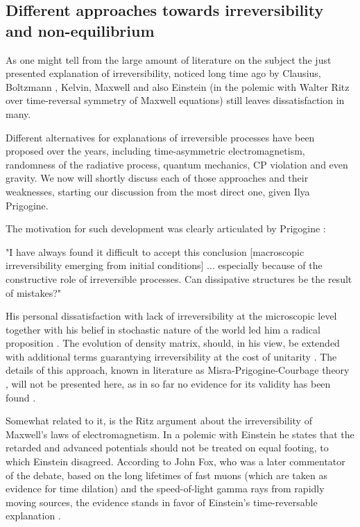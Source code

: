 \documentclass[a4paper,12pt]{article}
\begin{document}
\subsection{Different approaches towards irreversibility and non-equilibrium}

As one might tell from the large amount of literature on the subject \cite{Doyle:wf, Layzer:1970dx, Wolfram:552851, Rovelli:2015tv, Courbage:1983eo} %
the just presented explanation of irreversibility, noticed long time ago by Clausius, Boltzmann \cite{Wolfram:552851}, Kelvin, Maxwell \cite{Anonymous:0uVSJOI5} and also Einstein (in the polemic with Walter Ritz over time-reversal symmetry of Maxwell equations) still leaves dissatisfaction in many.

Different alternatives for explanations of irreversible processes have been proposed over the years, including time-asymmetric electromagnetism, randomness of the radiative process, quantum mechanics, CP violation and even gravity. We now will shortly discuss each of those approaches and their weaknesses, starting our discussion from the most direct one, given Ilya Prigogine.

The motivation for such development was clearly articulated by Prigogine \cite{Prigogine:1978kz}:
\begin{displayquote}
"I have always found it difficult to accept this conclusion [macroscopic irreversibility emerging from initial conditions] {...} especially because of the constructive role of irreversible processes. Can dissipative structures be the result of mistakes?"
\end{displayquote}

His personal dissatisfaction with lack of irreversibility at the microscopic level together with his belief in stochastic nature of the world led him a radical proposition \cite{Gustafson:2004kx}.
The evolution of density matrix, should, in his view, be extended with additional terms guarantying irreversibility at the cost of unitarity \cite{Prigogine:1978kz}.
The details of this approach, known in literature as Misra-Prigogine-Courbage theory \cite{Courbage:1983eo}, will not be presented here, as in so far no evidence for its validity has been found \cite{Bricmont:7zJsfTpK}.

Somewhat related to it, is the Ritz argument about the irreversibility of Maxwell's laws of electromagnetism. In a polemic with Einstein he states that the retarded and advanced potentials should not be treated on equal footing, to which Einstein disagreed. 
According to John Fox, who was a later commentator of the debate, based on the long lifetimes of fast muons (which are taken as evidence for time dilation) and the speed-of-light gamma rays from rapidly moving sources, the evidence stands in favor of Einstein's time-reversable explanation \cite{Fox:1965bg}.
\end{document}
